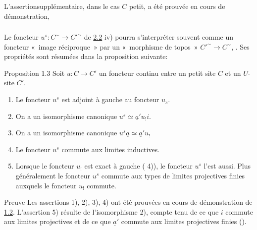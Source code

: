 \documentclass[10pt]{../fichiers-configuration-latex/smfart}
\begin{document}
L'assertion\pageoriginale supplémentaire, dans le cas $C$ petit,
a été prouvée en cours de démonstration, \cqfd

\setcounter{subsection}{2} \setcounter{subsubsection}{0}
\subsubsection{}

Le foncteur $u^s:C^{\sim}\rightarrow {C'}^{\sim}$ de
\hyperref[III.prop2.2]{2.2} iv) pourra s'interpréter souvent comme un
foncteur « image réciproque » par un « morphisme de topos » ${C'}^{\sim}\rightarrow C^{\sim}$, \cf {}. Ses
propriétés sont résumées dans la proposition
suivante:

\begin{enonce*}{Proposition 1.3}
Soit $u:C\rightarrow C'$ un foncteur continu entre un petit site $C$
et un $U$-site $C'$.
\begin{enumerate}
\renewcommand{\labelenumi}{\theenumi)}
\item Le foncteur $u^s$ est adjoint à gauche au foncteur $u_s$.

\item On a un isomorphisme canonique $u^s\simeq \underline{a}'u_{!}i$.

\item On a un isomorphisme canonique $u^s\underline{a}\simeq
  \underline{a}'u_{!}$

\item Le foncteur $u^s$ commute aux limites inductives.

\item Lorsque le foncteur $u_{!}$ est exact à gauche (\cf {} 4)),
  le foncteur $u^s$ l'est aussi. Plus généralement le foncteur
  $u^s$ commute aux types de limites projectives finies auxquels le
  foncteur $u_{!}$ commute.
\end{enumerate}
\end{enonce*}

\begin{enonce*}[remark]{Preuve}
Les assertions 1), 2), 3), 4) ont été prouvées en cours
de démonstration de \hyperref[III.prop1.2]{1.2}. L'assertion 5)
résulte de l'isomorphisme 2), compte tenu de ce que $i$ commute
aux limites projectives et de ce que $\underline{a}'$ commute aux
limites projectives finies ().
\end{enonce*}
\end{document}
